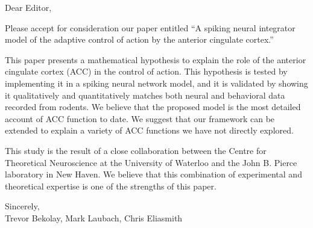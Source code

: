 \documentclass{letter}
\begin{document}
Dear Editor,

Please accept for consideration our paper entitled
``A spiking neural integrator model of the adaptive
control of action by the anterior cingulate cortex.''

This paper presents a mathematical hypothesis
to explain the role of the anterior cingulate cortex (ACC)
in the control of action.
This hypothesis is tested by implementing
it in a spiking neural network model,
and it is validated by showing it qualitatively
and quantitatively matches both neural and
behavioral data recorded from rodents.
We believe that the proposed model is the most
detailed account of ACC function
to date. We suggest that our framework can
be extended to explain a variety of
ACC functions we have not directly explored.

This study is the result of a close collaboration
between the Centre for Theoretical Neuroscience
at the University of Waterloo
and the John B. Pierce laboratory in New Haven.
We believe that this combination of
experimental and theoretical expertise
is one of the strengths of this paper.

Sincerely, \\
Trevor Bekolay, Mark Laubach, Chris Eliasmith
\end{document}
